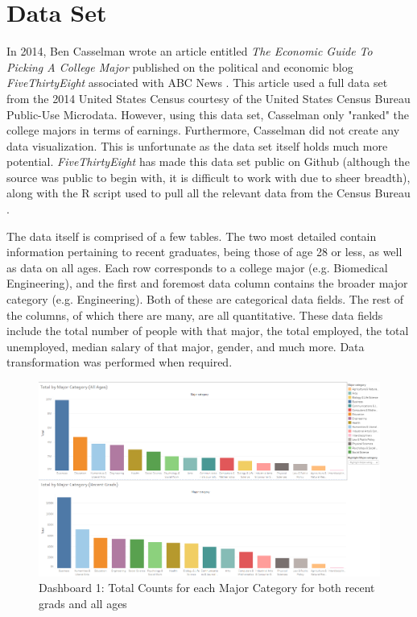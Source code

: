 \documentclass[sigchi]{acmart}
\begin{document}
\section{Data Set}

In 2014, Ben Casselman wrote an article entitled \textit{The Economic Guide To Picking A College Major} published on the political and economic blog \textit{FiveThirtyEight} associated with ABC News \cite{fivethirtyeight}. This article used a full data set from the 2014 United States Census courtesy of the United States Census Bureau Public-Use Microdata. However, using this data set, Casselman only "ranked" the college majors in terms of earnings. Furthermore, Casselman did not create any data visualization. This is unfortunate as the data set itself holds much more potential. \textit{FiveThirtyEight} has made this data set public on Github (although the source was public to begin with, it is difficult to work with due to sheer breadth), along with the R script used to pull all the relevant data from the Census Bureau \cite{github}. 

The data itself is comprised of a few tables. The two most detailed contain information pertaining to recent graduates, being those of age 28 or less, as well as data on all ages. Each row corresponds to a college major (e.g. Biomedical Engineering), and the first and foremost data column contains the broader major category (e.g. Engineering). Both of these are categorical data fields. The rest of the columns, of which there are many, are all quantitative. These data fields include the total number of people with that major, the total employed, the total unemployed, median salary of that major, gender, and much more. Data transformation was performed when required.

  \begin{figure}[thpb]
  \includegraphics[width=1.0\textwidth]{DB1.png}
     \caption{Dashboard 1: Total Counts for each Major Category for both recent grads and all ages}
         \label{fig:db1}
  \end{figure}
  
\end{document}
